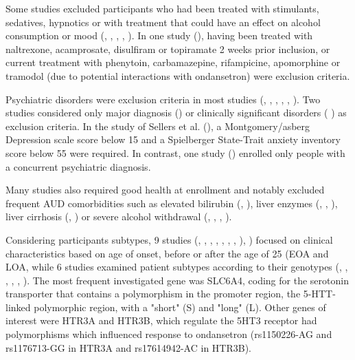 Some studies excluded participants who had been treated with stimulants, sedatives, hypnotics or with treatment that could have an effect on alcohol consumption or mood (\cite{correa_filho_pilot_2013}, \cite{johnson_ondansetron_2000}, \cite{johnson_combining_2000}, \cite{ait-daoud_combining_2001}, \cite{dawes_prospective_2005}). In one study (\cite{sherwood_brown_randomized_2021}), having been treated with naltrexone, acamprosate, disulfiram or topiramate 2 weeks prior inclusion, or current treatment with phenytoin, carbamazepine, rifampicine, apomorphine or tramodol (due to potential interactions with ondansetron) were exclusion criteria.

Psychiatric disorders were exclusion criteria in most studies (\cite{johnson_ondansetron_2000}, \cite{johnson_combining_2000}, \cite{ait-daoud_combining_2001} \cite{kranzler_effects_2003}, \cite{kenna_within-group_2009}, \cite{johnson_pharmacogenetic_2011}, \cite{kenna_ondansetron_2014}). Two studies considered only major diagnosis (\cite{myrick_effect_2008}) or clinically significant disorders (\cite{correa_filho_pilot_2013} \cite{dawes_prospective_2005}) as exclusion criteria. In the study of Sellers et al. (\cite{sellers_clinical_1994}), a Montgomery/asberg Depression scale score below 15 and a Spielberger State-Trait anxiety inventory score below 55 were required. In contrast, one study (\cite{sherwood_brown_randomized_2021}) enrolled only people with a concurrent psychiatric diagnosis.

Many studies also required good health at enrollment and notably excluded frequent AUD comorbidities such as elevated bilirubin (\cite{johnson_ondansetron_2000}, \cite{kenna_within-group_2009}), liver enzymes (\cite{dawes_prospective_2005}, \cite{kenna_within-group_2009}, \cite{sherwood_brown_randomized_2021}), liver cirrhosis (\cite{correa_filho_pilot_2013}, \cite{sherwood_brown_randomized_2021}) or severe alcohol withdrawal (\cite{johnson_combining_2000}, \cite{johnson_ondansetron_2000}, \cite{dawes_prospective_2005}, \cite{sherwood_brown_randomized_2021}).

Considering participants subtypes, 9 studies (\cite{johnson_ondansetron_2000}, \cite{johnson_combining_2000}, \cite{ait-daoud_combining_2001}, \cite{ait-daoud_combining_2001-1}, \cite{johnson_ondansetron_2002}, \cite{johnson_ondansetron_2003}, \cite{kranzler_effects_2003}, \cite{roache_prediction_2008}), \cite{sherwood_brown_randomized_2021}) focused on clinical characteristics based on age of onset, before or after the age of 25 (EOA and LOA, while 6 studies examined patient subtypes according to their genotypes (\cite{johnson_pharmacogenetic_2011}, \cite{seneviratne_serotonin_2012}, \cite{johnson_determination_2013}, \cite{kenna_ondansetron_2014}, \cite{kenna_ondansetron_2014-1}, \cite{hou_subgroup_2015}). The most frequent investigated gene was SLC6A4, coding for the serotonin transporter that contains a polymorphism in the promoter region, the 5-HTT-linked polymorphic region, with a "short" (S) and "long" (L). Other genes of interest were HTR3A and HTR3B, which regulate the 5HT3 receptor had polymorphisms which influenced response to ondansetron (rs1150226-AG and rs1176713-GG in HTR3A and rs17614942-AC in HTR3B).

